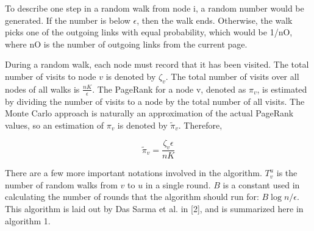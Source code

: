 \documentclass[letterpaper, 10 pt, conference]{ieeeconf}  %
\begin{document}
To describe one step in a random walk from node i, a random number would be generated. If the number is below $\epsilon$, then the walk ends. Otherwise, the walk picks one of the outgoing links with equal probability, which would be 1/nO, where nO is the number of outgoing links from the current page. 

During a random walk, each node must record that it has been visited. The total number of visits to node $v$ is denoted by $\zeta_v$. The total number of visits over all nodes of all walks is $\frac{n K}{\epsilon}$. The PageRank for a node v, denoted as $\pi_v$, is estimated by dividing the number of visits to a node by the total number of all visits. The Monte Carlo approach is naturally an approximation of the actual PageRank values, so an estimation of $\pi_v$ is denoted by $\tilde{\pi}_v$. Therefore,

\begin{equation}
\tilde{\pi}_v = \frac{\zeta_v\epsilon}{n K}
\end{equation}

There are a few more important notations involved in the algorithm. $T_v^u$ is the number of random walks from $v$ to $u$ in a single round. $B$ is a constant used in calculating the number of rounds that the algorithm should run for: $B\log{n/\epsilon}$.
This algorithm is laid out by Das Sarma et al. in [2], and is summarized here in algorithm 1.

\makeatletter
\def\BState{\State\hskip-\ALG@thistlm}
\makeatother
\end{document}
